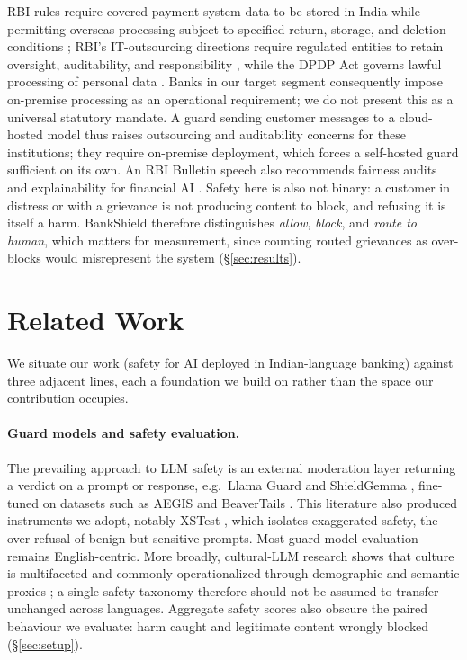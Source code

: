 \documentclass[11pt]{article}
\begin{document}
RBI rules require covered payment-system data to be stored in India while permitting overseas processing subject to specified return, storage, and deletion conditions \citep{rbi_paymentdata2018}; RBI's IT-outsourcing directions require regulated entities to retain oversight, auditability, and responsibility \citep{rbi_outsourcing2023}, while the DPDP Act governs lawful processing of personal data \citep{dpdp2023}. Banks in our target segment consequently impose on-premise processing as an operational requirement; we do not present this as a universal statutory mandate. A guard sending customer messages to a cloud-hosted model thus raises outsourcing and auditability concerns for these institutions; they require on-premise deployment, which forces a self-hosted guard sufficient on its own. An RBI Bulletin speech also recommends fairness audits and explainability for financial AI \citep{rao2024aibanking}. Safety here is also not binary: a customer in distress or with a grievance is not producing content to block, and refusing it is itself a harm. BankShield therefore distinguishes \emph{allow}, \emph{block}, and \emph{route to human}, which matters for measurement, since counting routed grievances as over-blocks would misrepresent the system (\S\ref{sec:results}).

\section{Related Work}
\label{sec:related}

We situate our work (safety for AI deployed in Indian-language banking) against three adjacent lines, each a foundation we build on rather than the space our contribution occupies.

\paragraph{Guard models and safety evaluation.} The prevailing approach to LLM safety is an external moderation layer returning a verdict on a prompt or response, e.g.\ Llama Guard \citep{inan2023} and ShieldGemma \citep{zeng2024shieldgemma}, fine-tuned on datasets such as AEGIS \citep{ghosh2024aegis} and BeaverTails \citep{ji2023}. This literature also produced instruments we adopt, notably XSTest \citep{rottger2024xstest}, which isolates exaggerated safety, the over-refusal of benign but sensitive prompts. Most guard-model evaluation remains English-centric. More broadly, cultural-LLM research shows that culture is multifaceted and commonly operationalized through demographic and semantic proxies \citep{adilazuarda2024}; a single safety taxonomy therefore should not be assumed to transfer unchanged across languages. Aggregate safety scores also obscure the paired behaviour we evaluate: harm caught and legitimate content wrongly blocked (\S\ref{sec:setup}).
\end{document}
